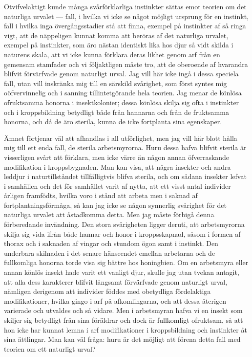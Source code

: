 Otvifvelaktigt kunde många svårförklarliga instinkter sättas emot teorien om det naturliga urvalet — fall, i hvilka vi icke se något möjligt ursprung för en instinkt, fall i hvilka inga övergångsstadier stå att finna, exempel på instinkter af så ringa vigt, att de näppeligen kunnat komma att beröras af det naturliga urvalet, exempel på instinkter, som äro nästan identiskt lika hos djur så vidt skilda i naturens skala, att vi icke kunna förklara deras likhet genom arf från en gemensam stamfader och vi följaktligen måste tro, att de oberoende af hvarandra blifvit förvärfvade genom naturligt urval. Jag vill här icke ingå i dessa speciela fall, utan vill inskränka mig till en särskild svårighet, som först syntes mig oöfvervinnelig och i sanning tillintetgörande hela teorien. Jag menar de könlösa ofruktsamma honorna i insektkolonier; dessa könlösa skilja sig ofta i instinkter och i kroppsbildning betydligt både från hannarna och från de fruktsamma honorna, och då de äro sterila, kunna de icke fortplanta sina egenskaper.

Ämnet förtjenar väl att afhandlas i all utförlighet, men jag vill här blott hålla mig till ett enda fall, de sterila arbetsmyrorna. Huru dessa hafva blifvit sterila är visserligen svårt att förklara, men icke värre än någon annan öfverraskande modifikation i kroppsbygnaden. Man kan visa, att några insekter och andra leddjur i naturtillståndet tillfälligtvis blifva sterila, och om sådana insekter lefvat i samhällen och det för samhället varit af nytta, att ett visst antal individer årligen framfödts, hvilka voro i stånd att arbeta men i saknad af fortplantningsförmåga, så kan jag icke se någon synnerlig svårighet för det naturliga urvalet att åstadkomma detta. Men jag måste förbigå denna förberedande invändning. Den stora svårigheten ligger deruti, att arbetsmyrorna skilja sig vida ifrån både hannar och honor i kroppsskapnad, såsom i formen af thorax och i saknaden af vingar och stundom ögon samt i instinkt. Den underbara skilnaden i det senare hänseendet emellan arbetarna och de fullkomliga honorna torde visa sig bättre hos honingbien. Om en arbetsmyra eller annan könlös insekt hade varit ett vanligt djur, skulle jag utan tvekan antagit, att alla dess karakterer blifvit långsamt förvärfvade genom naturligt urval, nämligen derigenom att individer föddes med obetydliga fördelaktiga modifikationer, hvilka gingo i arf på afkomlingarna, och att dessa återigen varierade och utvaldes och så vidare. Men i arbetsmyran hafva vi en insekt som skiljer sig betydligt från sina föräldrar och dock är fullkomligt ofruktsam, så att hon icke har kunnat lemna i arf modifikationer i kroppsbildning och instinkter åt sina ättlingar. Man kan väl fråga: huru är det möjligt att förena detta fall med teorien om ett naturligt urval?

